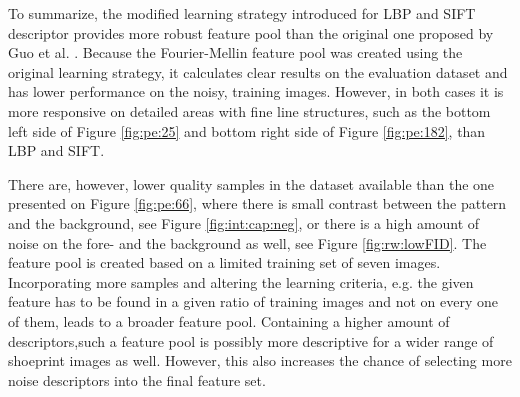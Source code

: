 \documentclass[draft,final]{vutinfth} %
\begin{document}
\par
To summarize, the modified learning strategy introduced for LBP and SIFT descriptor provides more robust feature pool than the original one proposed by Guo et al. \cite{guo2012discriminative}.
Because the Fourier-Mellin feature pool was created using the original learning strategy, it calculates clear results  on the evaluation dataset and has lower performance on the noisy, training images.
However, in both cases it is more responsive on detailed areas with fine line structures, such as the bottom left side of Figure \ref{fig:pe:25} and bottom right side of Figure \ref{fig:pe:182}, than LBP and SIFT.
\par
There are, however, lower quality samples in the dataset available than the one presented on Figure  \ref{fig:pe:66}, where there is small contrast between the pattern and the background, see Figure  \ref{fig:int:cap:neg}, or there is a high amount of noise on the fore- and the background as well, see Figure \ref{fig:rw:lowFID}.
The feature pool is created based on a limited training set of seven images.
Incorporating more samples and altering the learning criteria, e.g. the given feature has to be found in a given ratio of training images and not on every one of them, leads to a broader feature pool.
Containing a higher amount of descriptors,such a feature pool is possibly more descriptive for a wider range of shoeprint images as well.
However, this also increases the chance of selecting more noise descriptors into the final feature set.
\end{document}
